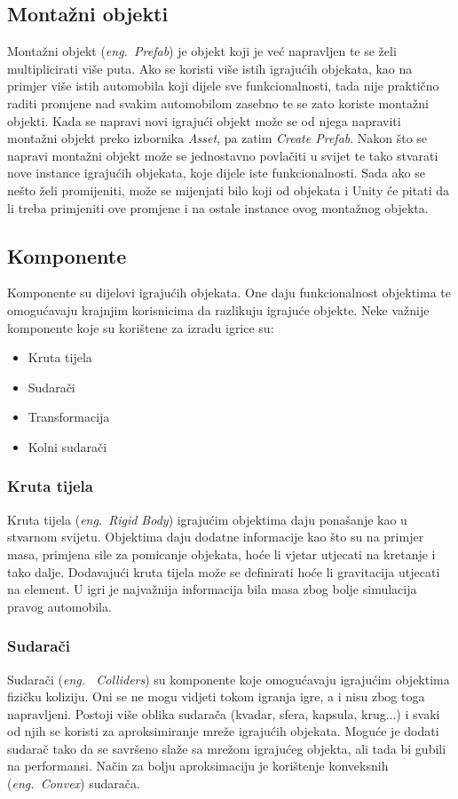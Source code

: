 \subsection{Montažni objekti}
Montažni objekt (\emph{eng.~Prefab}) je objekt koji je već napravljen te se želi multiplicirati više puta. Ako se koristi više istih igrajućih objekata, kao na primjer više istih automobila koji dijele sve funkcionalnosti, tada nije praktično raditi promjene nad svakim automobilom zasebno te se zato koriste montažni objekti. Kada se napravi novi igrajući objekt može se od njega napraviti montažni objekt preko izbornika \emph{Asset}, pa zatim \emph{Create Prefab}. Nakon što se napravi montažni objekt može se jednostavno povlačiti u svijet te tako stvarati nove instance igrajućih objekata, koje dijele iste funkcionalnosti. Sada ako se nešto želi promijeniti, može se mijenjati bilo koji od objekata i Unity će pitati da li treba primjeniti ove promjene i na ostale instance ovog montažnog objekta.

\subsection{Komponente}
Komponente su dijelovi igrajućih objekata. One daju funkcionalnost objektima te omogućavaju krajnjim korisnicima da razlikuju igrajuće objekte. Neke važnije komponente koje su korištene za izradu igrice su:

\begin{itemize} 
	\item Kruta tijela
	\item Sudarači
	\item Transformacija
	\item Kolni sudarači 
\end{itemize}

\subsubsection{Kruta tijela}
Kruta tijela (\emph{eng.~Rigid Body}) igrajućim objektima daju ponašanje kao u stvarnom svijetu. Objektima daju dodatne informacije kao što su na primjer masa, primjena sile za pomicanje objekata, hoće li vjetar utjecati na kretanje i tako dalje. Dodavajući kruta tijela može se definirati hoće li gravitacija utjecati na element. U igri je najvažnija informacija bila masa zbog bolje simulacija pravog automobila.
\subsubsection{Sudarači}
Sudarači (\emph{eng.~ Colliders}) su komponente koje omogućavaju igrajućim objektima fizičku koliziju. Oni se ne mogu vidjeti tokom igranja igre, a i nisu zbog toga napravljeni. Postoji više oblika sudarača (kvadar, sfera, kapsula, krug...) i svaki od njih se koristi za aproksimiranje mreže igrajućih objekata. Moguće je dodati sudarač tako da se savršeno slaže sa mrežom igrajućeg objekta, ali tada bi gubili na performansi. Način za bolju aproksimaciju je korištenje konveksnih (\emph{eng.~Convex}) sudarača.

